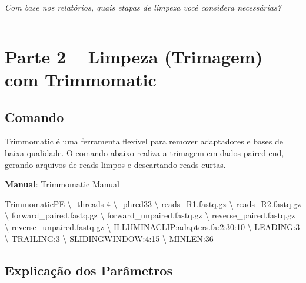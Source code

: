 \documentclass[
  brazilian,
  letterpaper,
  DIV=11,
  numbers=noendperiod]{scrartcl}
\newenvironment{Shaded}{\begin{snugshade}}{\end{snugshade}}
\newcommand{\AttributeTok}[1]{\textcolor[rgb]{0.40,0.45,0.13}{#1}}
\newcommand{\DataTypeTok}[1]{\textcolor[rgb]{0.68,0.00,0.00}{#1}}
\newcommand{\ExtensionTok}[1]{\textcolor[rgb]{0.00,0.23,0.31}{#1}}
\newcommand{\NormalTok}[1]{\textcolor[rgb]{0.00,0.23,0.31}{#1}}
\begin{document}
\emph{Com base nos relatórios, quais etapas de limpeza você considera
necessárias?}

\begin{center}\rule{0.5\linewidth}{0.5pt}\end{center}

\section{Parte 2 -- Limpeza (Trimagem) com
Trimmomatic}\label{parte-2-limpeza-trimagem-com-trimmomatic}

\subsection{Comando}\label{comando}

Trimmomatic é uma ferramenta flexível para remover adaptadores e bases
de baixa qualidade. O comando abaixo realiza a trimagem em dados
paired-end, gerando arquivos de reads limpos e descartando reads curtas.

\textbf{Manual}:
\href{http://www.usadellab.org/cms/?page=trimmomatic}{Trimmomatic
Manual}

\begin{Shaded}
\begin{Highlighting}[]
\ExtensionTok{TrimmomaticPE} \DataTypeTok{\textbackslash{}}
    \AttributeTok{{-}threads}\NormalTok{ 4 }\DataTypeTok{\textbackslash{}}
    \AttributeTok{{-}phred33} \DataTypeTok{\textbackslash{}}
\NormalTok{    reads\_R1.fastq.gz }\DataTypeTok{\textbackslash{}}
\NormalTok{    reads\_R2.fastq.gz }\DataTypeTok{\textbackslash{}}
\NormalTok{    forward\_paired.fastq.gz }\DataTypeTok{\textbackslash{}}
\NormalTok{    forward\_unpaired.fastq.gz }\DataTypeTok{\textbackslash{}}
\NormalTok{    reverse\_paired.fastq.gz }\DataTypeTok{\textbackslash{}}
\NormalTok{    reverse\_unpaired.fastq.gz }\DataTypeTok{\textbackslash{}}
\NormalTok{    ILLUMINACLIP:adapters.fa:2:30:10 }\DataTypeTok{\textbackslash{}}
\NormalTok{    LEADING:3 }\DataTypeTok{\textbackslash{}}
\NormalTok{    TRAILING:3 }\DataTypeTok{\textbackslash{}}
\NormalTok{    SLIDINGWINDOW:4:15 }\DataTypeTok{\textbackslash{}}
\NormalTok{    MINLEN:36}
\end{Highlighting}
\end{Shaded}

\subsection{Explicação dos
Parâmetros}\label{explicauxe7uxe3o-dos-paruxe2metros}
\end{document}
